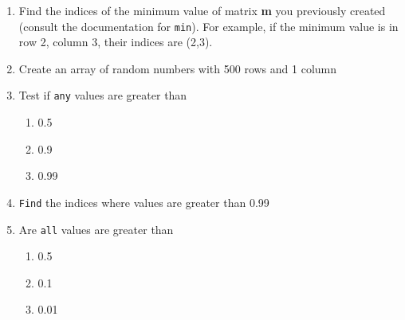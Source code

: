 \documentclass[a4paper]{article}
\begin{document}
	\begin{enumerate}
		\item  Find the indices of the minimum value of matrix \textbf{m} you previously created (consult the documentation for \texttt{min}).
		For example, if the minimum value is in row 2, column 3, their indices are (2,3).
		
		\item Create an array of random numbers with 500 rows and 1 column
		\item Test if \texttt{any} values are greater than
			\begin{enumerate}
				\item 0.5
				\item 0.9
				\item 0.99
			\end{enumerate}
		\item \texttt{Find} the indices where values are greater than 0.99
		\item Are \texttt{all} values are greater than
			\begin{enumerate}
				\item 0.5
				\item 0.1
				\item 0.01
			\end{enumerate}
	\end{enumerate}
\end{document}
